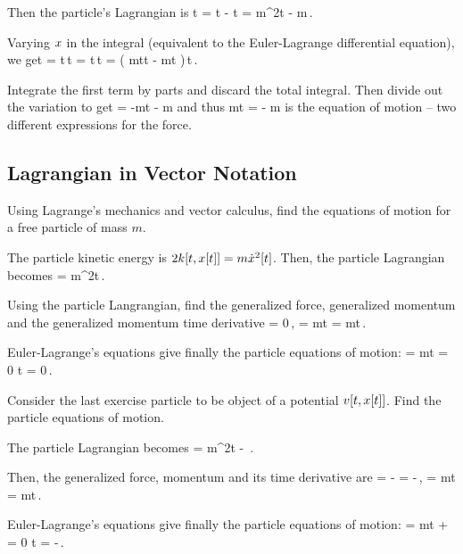Then the particle's Lagrangian is
\beq
\lag\vat t = \ken\vat t - \pen\vat t
           = m\dt\pvec^2\vat t - m\zeta{}\,.
\eeq

Varying $x$ in the integral (equivalent to the Euler-Lagrange differential equation), we get
 = \delta\int\lag\vat t\,\dx t 
  = \int\delta\lag\vat t\,\dx t
  = \int\left( m\dt\pvec\vat t\iprod \delta\dt\pvec\vat t
               - m\zeta{}\iprod\delta\pvec\vat t
         \right)\,\dx t\,.
\eeq

Integrate the first term by parts and discard the total integral. Then divide out the variation to get
 = -m\ddt\pvec\vat t - m\gder\zeta{}
\eeq
and thus
\beq
m\ddt\pvec\vat t = - m\gder\zeta{}
\eeq
is the equation of motion -- two different expressions for the force.


\subsection{Lagrangian in Vector Notation}
Using Lagrange's mechanics and vector calculus, find the equations of motion for a free particle of mass $m$.

\begin{solution}
The particle kinetic energy is $2k\!\left[{t, x\!\left[{t}\right]}\right] = m\dot{x}^2\!\left[{t}\right]$. Then, the particle Lagrangian becomes
\beq
\lag\vattpvec = m\dt\pvec^2\vat t\,.
\eeq

Using the particle Langrangian, find the generalized force, generalized momentum and the generalized momentum time derivative
\beq
\xpd{\lag}{\pvec} = 0\,,\qquad
\xpd{\lag}{\dt\pvec} = m\dt\pvec\vat t\qquad{}\qquad
{}\xpd{\lag}{\dt\pvec} = m\ddt\pvec\vat t\,.
\eeq

Euler-Lagrange's equations give finally the particle equations of motion:
\beq
\eleqn{\pvec}{} = m\ddt\pvec\vat t = 0\implies 
\ddt\pvec\vat t = 0\,.\mqed
\eeq
\end{solution}


Consider the last exercise particle to be object of a potential $v\!\left[{t, x\!\left[{t}\right]}\right]$. Find the particle equations of motion.

\begin{solution}
The particle Lagrangian becomes
\beq
\lag\vattpvec = m\dt\pvec^2\vat t - \pen\vattpvec\,.
\eeq

Then, the generalized force, momentum and its time derivative are
\beq
\xpd{\lag}{\pvec} = -\xpd{\pen\vattpvec}{\pvec} = -\gder\pen\vattpvec \,,\qquad
\xpd{\lag}{\dt\pvec} = m\dt\pvec\vat t\qquad{}\qquad
{}\xpd{\lag}{\dt\pvec} = m\ddt\pvec\vat t\,.
\eeq

Euler-Lagrange's equations give finally the particle equations of motion:
\beq
\eleqn{\pvec}{} = m\ddt\pvec\vat t + \gder\pen\vattpvec = 0\implies 
\ddt\pvec\vat t = -\gder\pen\vattpvec \,.\mqed
\eeq
\end{solution}



